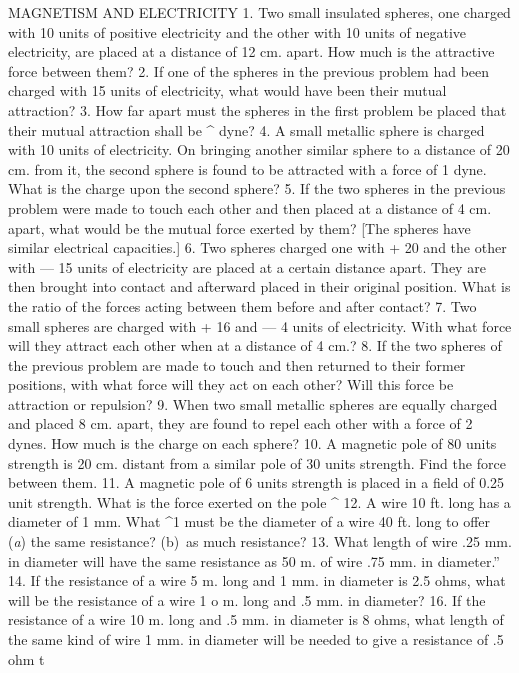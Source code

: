 MAGNETISM AND ELECTRICITY
1. Two small insulated spheres, one charged with 10 units of positive electricity and the other with 10 units of negative electricity, are placed at a distance of 12 cm. apart. How much is the attractive force between them?
2. If one of the spheres in the previous problem had been charged with 15 units of electricity, what would have been their mutual attraction?
3. How far apart must the spheres in the first problem be placed that their mutual attraction shall be ^ dyne?
4. A small metallic sphere is charged with 10 units of electricity. On bringing another similar sphere to a distance of 20 cm. from it, the second sphere is found to be attracted with a force of 1 dyne. What is the charge upon the second sphere?
5. If the two spheres in the previous problem were made to touch each other and then placed at a distance of 4 cm. apart, what would be the mutual force exerted by them? [The spheres have similar electrical capacities.]
6. Two spheres charged one with + 20 and the other with — 15 units of electricity are placed at a certain distance apart. They are then brought into contact and afterward placed in their original position. What is the ratio of the forces acting between them before and after contact?
7. Two small spheres are charged with + 16 and — 4 units of electricity. With what force will they attract each other when at a distance of 4 cm.?
8. If the two spheres of the previous problem are made to touch and then returned to their former positions, with what force will they act on each other? Will this force be attraction or repulsion?
9. When two small metallic spheres are equally charged and placed 8 cm. apart, they are found to repel each other with a force of 2 dynes. How much is the charge on each sphere?
10. A magnetic pole of 80 units strength is 20 cm. distant from a similar pole of 30 units strength. Find the force between them.
11. A magnetic pole of 6 units strength is placed in a field of 0.25 unit strength. What is the force exerted on the pole ^
12. A wire 10 ft. long has a diameter of 1 mm. What ^1 must be the diameter of a wire 40 ft. long to offer (\emph{a}) the same resistance? (b)\ as much resistance?
13. What length of wire .25 mm. in diameter will have the same resistance as 50 m. of wire .75 mm. in diameter.''
14. If the resistance of a wire 5 m. long and 1 mm. in diameter is 2.5 ohms, what will be the resistance of a wire 1 o m. long and .5 mm. in diameter?
16. If the resistance of a wire 10 m. long and .5 mm. in diameter is 8 ohms, what length of the same kind of wire 1 mm. in diameter will be needed to give a resistance of .5 ohm t
